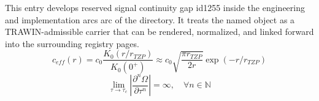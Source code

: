 
\begin{tzpsnapshot}
\end{tzpsnapshot}

This entry develops reserved signal continuity gap id1255 inside the engineering and implementation arcs arc of the directory. It treats the named object as a TRAWIN-admissible carrier that can be rendered, normalized, and linked forward into the surrounding registry pages.
\[
c_{eff}(r) = c_0 \frac{K_0(r/r_{TZP})}{K_0(0^+)} \approx c_0 \sqrt{\frac{\pi r_{TZP}}{2r}} \exp(-r/r_{TZP})
\]
\[
\lim_{\tau \to \tau_c} \left| \frac{\partial^n \Omega}{\partial \tau^n} \right| = \infty, \quad \forall n \in \mathbb{N}
\]


